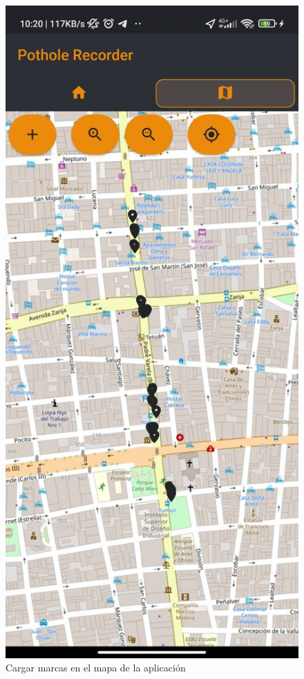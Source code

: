 \begin{figure}[htb]
		\includegraphics[scale = 0.175]{Graphics/map_marks_apk.jpg}
		\caption{Cargar marcas en el mapa de la aplicación}
		\label{fig:8}
	\end{figure}
	\newpage

